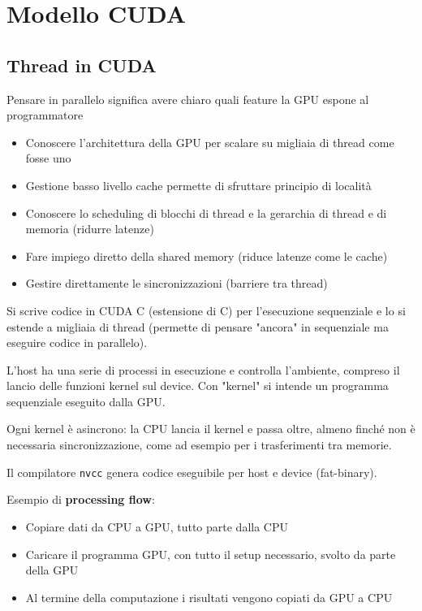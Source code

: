 \section{Modello CUDA}

\subsection{Thread in CUDA}

Pensare in parallelo significa avere chiaro quali feature la GPU espone al programmatore
\begin{itemize}
	\item Conoscere l'architettura della GPU per scalare su migliaia di thread come fosse uno
	
	\item Gestione basso livello cache permette di sfruttare principio di località
	
	\item Conoscere lo scheduling di blocchi di thread e la gerarchia di thread e di memoria (ridurre latenze)
	
	\item Fare impiego diretto della shared memory (riduce latenze come le cache)
	
	\item Gestire direttamente le sincronizzazioni (barriere tra thread)
\end{itemize}

Si scrive codice in CUDA C (estensione di C) per l'esecuzione sequenziale e lo si estende a migliaia di thread (permette di pensare "ancora" in sequenziale ma eseguire codice in parallelo).

L'host ha una serie di processi in esecuzione e controlla l'ambiente, compreso il lancio delle funzioni kernel sul device. Con "kernel" si intende un programma sequenziale eseguito dalla GPU.

Ogni kernel è asincrono: la CPU lancia il kernel e passa oltre, almeno finché non è necessaria sincronizzazione, come ad esempio per i trasferimenti tra memorie.

Il compilatore \texttt{nvcc} genera codice eseguibile per host e device (fat-binary).

Esempio di \textbf{processing flow}: 
\begin{itemize}
	\item Copiare dati da CPU a GPU, tutto parte dalla CPU
	
	\item Caricare il programma GPU, con tutto il setup necessario, svolto da parte della GPU
	
	\item Al termine della computazione i risultati vengono copiati da GPU a CPU
\end{itemize}

